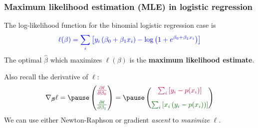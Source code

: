 \documentclass[smaller]{beamer}
\newcommand{\lt}{\left}
\newcommand{\rt}{\right}
\newcommand{\?}{\stackrel{?}{=}}
\newcommand{\rd}{\color{red}}
\newcommand{\bl}{\color{blue}}
\newcommand{\pl}{\color{purple}}
\newcommand{\gr}{\color{green!40!black}}
\newcommand{\pd}[2]{\frac{\partial{#1}}{\partial{#2}}}
\begin{document}
\begin{frame}
  \frametitle{Maximum likelihood estimation (MLE) in logistic
    regression}\pause

  The log-likelihood function for the binomial logistic regression case is \pause
  \begin{equation}
    \label{eq:16}
    \bl \ell(\beta) = \sum_i \lt[ y_i\lt(\beta_0 + \beta_1x_i \rt) - \log\lt(1 + e^{\beta_0 + \beta_1x_i}\rt) \rt]
  \end{equation}
  \pause
  The optimal $\hat{\beta}$ which maximizes $\ell(\beta)$ is the \textbf{\rd maximum likelihood estimate}.

  \pause

  \bigskip

  Also recall the derivative of $\ell$: \pause
  \begin{equation}
    \label{eq:17}
    \nabla_{\bm\beta}\ell = \pause
    \begin{pmatrix}
      {\pl \pd{\ell}{\beta_0}}\\[3mm]
      {\gr \pd{\ell}{\beta_1}}
    \end{pmatrix} = \pause
    \begin{pmatrix}
      \pl \sum_i \lt[y_i - p(x_i) \rt]\\[3mm]
      \gr \sum_i \lt[ x_i\lt(y_i - p(x_i)\rt)\rt] 
    \end{pmatrix}
  \end{equation}
  \pause
  We can use either Newton-Raphson or gradient \textit{\rd ascent} to \textit{\rd maximize} $\ell$.
\end{frame}
\end{document}
